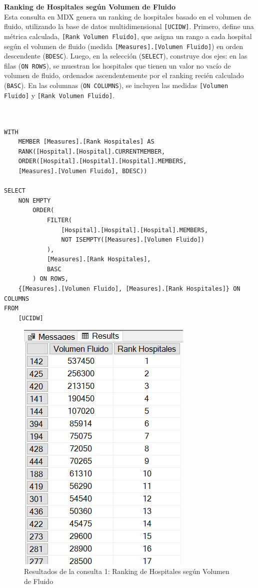 \documentclass{article}
\begin{document}
\textbf{Ranking de Hospitales según Volumen de Fluido}
\\

Esta consulta en MDX genera un ranking de hospitales basado en el volumen de fluido, utilizando la base de datos multidimensional \texttt{[UCIDW]}. Primero, define una métrica calculada, \texttt{[Rank Volumen Fluido]}, que asigna un rango a cada hospital según el volumen de fluido (medida \texttt{[Measures].[Volumen Fluido]}) en orden descendente (\texttt{BDESC}). Luego, en la selección (\texttt{SELECT}), construye dos ejes: en las filas (\texttt{ON ROWS}), se muestran los hospitales que tienen un valor no vacío de volumen de fluido, ordenados ascendentemente por el ranking recién calculado (\texttt{BASC}). En las columnas (\texttt{ON COLUMNS}), se incluyen las medidas \texttt{[Volumen Fluido]} y \texttt{[Rank Volumen Fluido]}. 
\\
	
\begin{lstlisting}[style=ddlstyle, label=lst:consulta1,caption=Consulta 1: Ranking de Hospitales según Volumen de Fluido]


WITH 
	MEMBER [Measures].[Rank Hospitales] AS 
	RANK([Hospital].[Hospital].CURRENTMEMBER, 
	ORDER([Hospital].[Hospital].[Hospital].MEMBERS, 
	[Measures].[Volumen Fluido], BDESC))

SELECT 
	NON EMPTY 
		ORDER(
			FILTER(
				[Hospital].[Hospital].[Hospital].MEMBERS,
				NOT ISEMPTY([Measures].[Volumen Fluido])
			),
			[Measures].[Rank Hospitales],
			BASC
		) ON ROWS, 
	{[Measures].[Volumen Fluido], [Measures].[Rank Hospitales]} ON COLUMNS
FROM 
	[UCIDW]
\end{lstlisting}

\begin{figure}[H]
	\centering
	\includegraphics[width=0.35\linewidth]{images/consulta1.png}
	\caption{Resultados de la consulta 1: Ranking de Hospitales según Volumen de Fluido}
	\label{fig:consulta1}
\end{figure}
\end{document}
